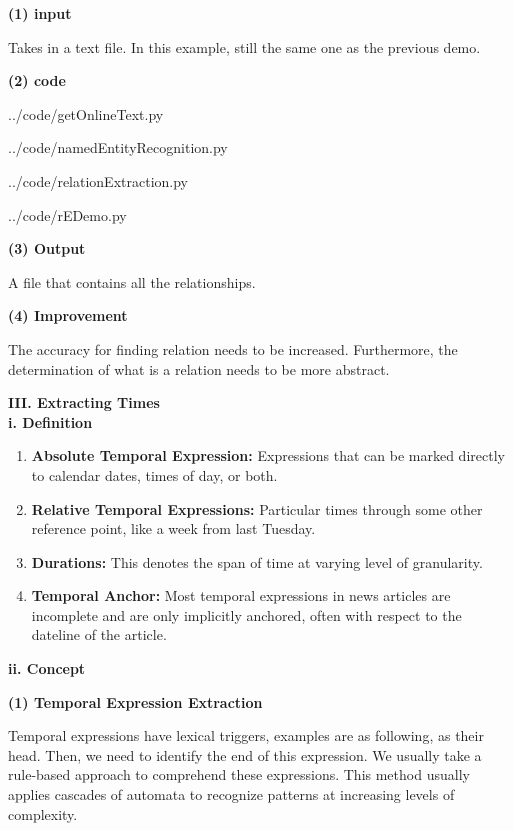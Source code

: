 \documentclass[a4paper,12pt]{report}
\begin{document}
\noindent
\textbf{(1) input}

\noindent
Takes in a text file. In this example, still the same one as the previous demo.

\noindent
\textbf{(2) code}

\noindent
../code/getOnlineText.py

\noindent
../code/namedEntityRecognition.py

\noindent
../code/relationExtraction.py

\noindent
../code/rEDemo.py

\noindent
\textbf{(3) Output}

\noindent
A file that contains all the relationships.

\noindent
\textbf{(4) Improvement}

\noindent
The accuracy for finding relation needs to be increased. Furthermore, the determination of what is a relation needs to be more abstract. 

\pagebreak
\noindent
\textbf{III. Extracting Times}\\

\noindent
\textbf{i. Definition}

\begin{enumerate}
\item \textbf{Absolute Temporal Expression: }Expressions that can be marked directly to calendar dates, times of day, or both.
\item \textbf{Relative Temporal Expressions: }Particular times through some other reference point, like a week from last Tuesday.
\item \textbf{Durations: }This denotes the span of time at varying level of granularity. 
\item \textbf{Temporal Anchor: }Most temporal expressions in news articles are incomplete and are only implicitly anchored, often with respect to the dateline of the article.
\end{enumerate}

\noindent
\textbf{ii. Concept}

\noindent
\textbf{(1) Temporal Expression Extraction}

\noindent
Temporal expressions have lexical triggers, examples are as following, as their head. Then, we need to identify the end of this expression. We usually take a rule-based approach to comprehend these expressions. This method usually applies cascades of automata to recognize
patterns at increasing levels of complexity. 
 
\end{document}
